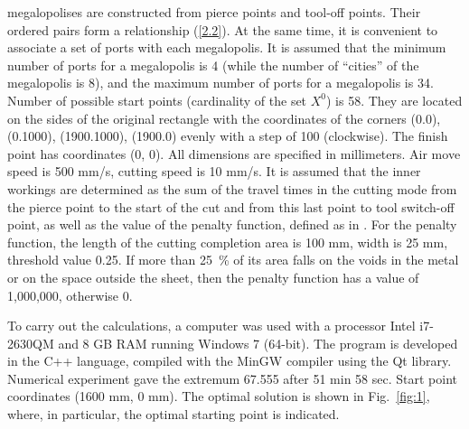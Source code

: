 \documentclass[numbers,sort&compress]{IntechOpen-Book}%
\begin{document}
megalopolises are constructed from pierce points and tool-off points.
Their ordered pairs form a relationship  (\ref{2.2}).
At the same time,
it is convenient to associate a set of ports with each megalopolis.
It is assumed that the minimum number of ports for a megalopolis is 4
(while the number of ``cities'' of the megalopolis is 8),
and the maximum number of ports for a megalopolis is 34.
Number of possible start points
(cardinality of the set $ X ^ 0 $)
is 58.
They are located on the sides of the original rectangle
with the coordinates of the corners
(0.0), (0.1000), (1900.1000), (1900.0)
evenly with a step of 100
(clockwise).
The finish point has coordinates (0, 0).
All dimensions are specified in millimeters.
Air move speed is 500 mm/s,
cutting speed is 10 mm/s.
It is assumed that the inner workings are determined
as the sum of the travel times in the cutting mode
from the pierce point to the start of the cut
and from this last point to
tool switch-off point,
as well as the value of the penalty function,
defined as in
\cite{18}.
For the penalty function,
the length of the cutting completion area is 100 mm,
width is 25 mm,
threshold value 0.25.
If more than 25~\% of its area
falls on the voids in the metal or on the space outside the sheet,
then the penalty function has a value of 1,000,000, otherwise 0.

To carry out the calculations,
a computer
was used
with a processor
Intel i7-2630QM and 8 GB RAM
running Windows 7 (64-bit).
The program is developed in the C++ language,
compiled with the MinGW compiler using the Qt library.
Numerical experiment gave the extremum 67.555
after
51 min 58 sec.
Start point coordinates
(1600 mm, 0 mm).
The optimal solution is shown in Fig.~\ref{fig:1},
where, in particular, the optimal starting point is indicated.

\begin{figure}
  \centering
\end{figure}
\end{document}
